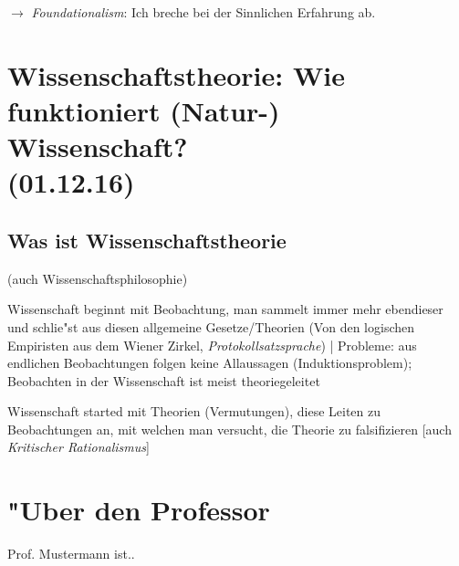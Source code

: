 \documentclass[emulatestandardclasses]{scrartcl}
\begin{document}
$\rightarrow$ \emph{Foundationalism}: Ich breche bei der Sinnlichen Erfahrung ab.

\section{Wissenschaftstheorie: Wie funktioniert (Natur-) Wissenschaft?\\(01.12.16)}

\subsection{Was ist Wissenschaftstheorie}

\begin{description}[leftmargin=!,labelwidth=\widthof{\bfseries Poppers Falsifikationismus}]
  \item[Wissenschaftstheorie] (auch Wissenschaftsphilosophie)
  \item[Induktivismus] Wissenschaft beginnt mit Beobachtung, man sammelt immer mehr ebendieser und schlie"st aus diesen allgemeine Gesetze/Theorien (Von den logischen Empiristen aus dem Wiener Zirkel, \emph{Protokollsatzsprache}) | Probleme: aus endlichen Beobachtungen folgen keine Allaussagen (Induktionsproblem); Beobachten in der Wissenschaft ist meist theoriegeleitet
  \item[Poppers Falsifikationismus] Wissenschaft started mit Theorien (Vermutungen), diese Leiten zu Beobachtungen an, mit welchen man versucht, die Theorie zu falsifizieren [auch \emph{Kritischer Rationalismus}]
  \item[Gegenbeispiel 2] 
\end{description}

\newpage
\section{"Uber den Professor}
Prof. Mustermann ist..


\end{document}
